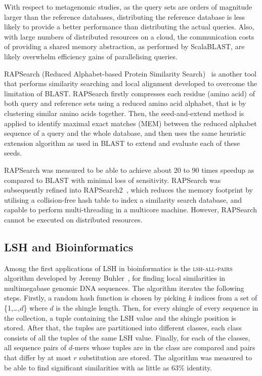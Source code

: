 \documentclass[titlepage]{csetr}
\begin{document}
With respect to metagenomic studies, as the query sets are orders of magnitude larger than the reference databases, distributing the reference database is less likely to provide a better performance than distributing the actual queries. Also, with large numbers of distributed resources on a cloud, the communication costs of providing a shared memory abstraction, as performed by ScalaBLAST, are likely overwhelm efficiency gains of parallelising queries.    




RAPSearch (Reduced Alphabet-based Protein Similarity Search)~\cite{RAPSearch} is another tool that performs similarity searching and local alignment developed to overcome the limitation of BLAST. RAPSearch firstly compresses each residue (amino acid) of both query and reference sets using a reduced amino acid alphabet, that is by clustering similar amino acids together. Then, the seed-and-extend method is applied to identify maximal exact matches (MEM) between the reduced alphabet sequence of a query and the whole database, and then uses the same heuristic extension algorithm as used in BLAST to extend and evaluate each of these seeds. 

RAPSearch was measured to be able to achieve about 20 to 90 times speedup as compared to BLAST with minimal loss of sensitivity. RAPSearch was subsequently refined into RAPSearch2~\cite{RAPSearch2}, which reduces the memory footprint by utilising a collision-free hash table to index a similarity search database, and capable to perform multi-threading in a multicore machine. However, RAPSearch cannot be executed on distributed resources.





\subsection{LSH and Bioinformatics}

Among the first applications of LSH in bioinformatics is the \textsc{lsh-all-pairs} algorithm developed by Jeremy Buhler~\cite{SequenceComparisonLSH}, for finding local similarities in multimegabase genomic DNA sequences. The algorithm iterates the following steps. Firstly, a random hash function is chosen by picking $k$ indices from a set of \{1,\ldots,$d$\} where $d$ is the shingle length. Then, for every shingle of every sequence in the collection, a tuple containing the LSH value and the shingle position is stored. After that, the tuples are partitioned into different classes, each class consists of all the tuples of the same LSH value. Finally, for each of the classes, all sequence pairs of $d$-mers whose tuples are in the class are compared and pairs that differ by at most $r$ substitution are stored. The algorithm was measured to be able to find significant similarities with as little as 63\% identity.
\end{document}
